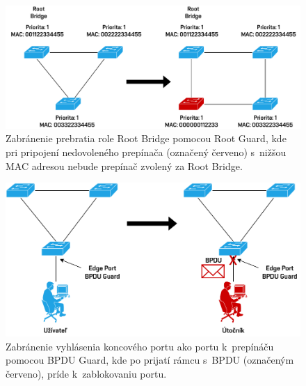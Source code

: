 \begin{figure}[H]
	\begin{center}
		\includegraphics[scale=0.75]{obrazky/root-guard.pdf}
	\end{center}
	\caption[Zabránenie prebratia role Root Bridge pomocou Root Guard]{Zabránenie prebratia role Root Bridge pomocou Root Guard, kde pri pripojení nedovoleného prepínača (označený červeno) s~nižšou MAC adresou nebude prepínač zvolený za Root Bridge.}
	\label{fig:root-guard}
\end{figure} 

\begin{figure}[H]
	\begin{center}
		\includegraphics[scale=0.75]{obrazky/bpdu-guard.pdf}
	\end{center}
	\caption[Ochrana prepínača BPDU Guard]{Zabránenie vyhlásenia koncového portu ako portu k~prepínáču pomocou BPDU Guard, kde po prijatí rámcu s~BPDU (označeným červeno), príde k~zablokovaniu portu.}
	\label{fig:bpdu-guard}
\end{figure} 

